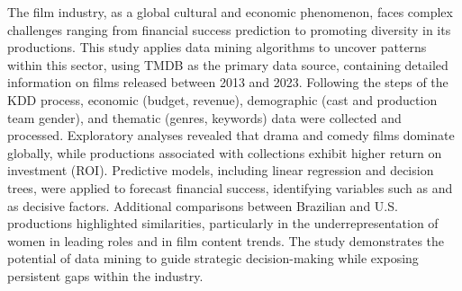 The film industry, as a global cultural and economic phenomenon, faces complex challenges ranging from financial success prediction to promoting diversity in its productions. This study applies data mining algorithms to uncover patterns within this sector, using \acrfull{TMDB} as the primary data source, containing detailed information on films released between 2013 and 2023. Following the steps of the \acrfull{KDD} process, economic (budget, revenue), demographic (cast and production team gender), and thematic (genres, keywords) data were collected and processed. Exploratory analyses revealed that drama and comedy films dominate globally, while productions associated with collections exhibit higher return on investment (\acrshort{ROI}). Predictive models, including linear regression and decision trees, were applied to forecast financial success, identifying variables such as  and  as decisive factors. Additional comparisons between Brazilian and U.S. productions highlighted similarities, particularly in the underrepresentation of women in leading roles and in film content trends. The study demonstrates the potential of data mining to guide strategic decision-making while exposing persistent gaps within the industry.